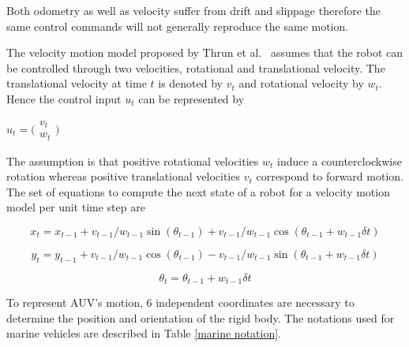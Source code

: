 \documentclass[12pt]{dalcsthesis}
\begin{document}
Both odometry as well as velocity suffer from drift and slippage therefore the same control commands will not generally reproduce the same motion.

The velocity motion model proposed by Thrun et al.\ \cite{thrun2005probabilistic} assumes that the robot can be controlled through two velocities, rotational and translational velocity. The translational velocity at time $t$ is denoted by $v_{t}$ and rotational velocity by $w_{t}$. Hence the control input $u_{t}$ can be represented by  
\begin{center}
$u_{t}=\bigl(\begin{array}{c}
                v_{t} \\
                w_{t}
               \end{array}\bigr)$
  
\end{center}

The assumption is that positive rotational velocities $w_{t}$ induce a counterclockwise rotation whereas positive translational velocities $v_{t}$ correspond to forward motion. The set of equations to compute the next state of a robot for a velocity motion model per unit time step are 

\begin{equation}
x_{t}=x_{t-1}+v_{t-1}/w_{t-1} \sin(\theta_{t-1})+ v_{t-1}/w_{t-1} \cos(\theta_{t-1} + w_{t-1} \delta t)
\end{equation}

\begin{equation}
y_{t}=y_{t-1}+v_{t-1}/w_{t-1} \cos(\theta_{t-1})- v_{t-1}/w_{t-1} \sin(\theta_{t-1} + w_{t-1} \delta t)
\end{equation}

\begin{equation}
\theta_{t}=\theta_{t-1}+ w_{t-1} \delta t
\end{equation}
 


To represent AUV's motion, 6 independent coordinates are necessary to determine the position and orientation of the rigid body. The notations used for marine vehicles are described in Table \ref{marine notation}. 
\end{document}
